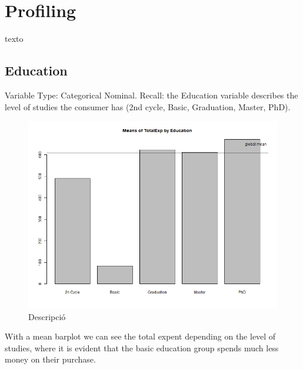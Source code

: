 \raggedright
\section{Profiling}

texto
\newline

\subsection{Education}
Variable Type: Categorical Nominal.\newline
Recall: the Education variable describes the level of studies the consumer has (2nd cycle, Basic, Graduation, Master, PhD).

\begin{figure}[H]
    \centering
    \includegraphics[width=0.8\linewidth]{Imatges/mean_barplot_TotalExp.png}
    \caption{Descripció}
    \label{fig:scree_plot}
\end{figure}
\newline
With a mean barplot we can see the total expent depending on the level of studies, where it is evident that the basic education group spends much less money on their purchase.


